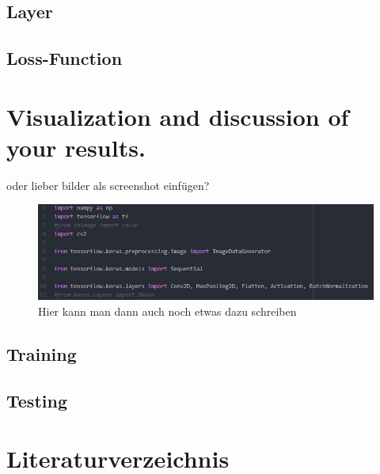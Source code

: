 \documentclass[12pt,letterpaper]{article}
\begin{document}
\subsection{Layer}
\subsection{Loss-Function}
\section{Visualization and discussion of your results.}
oder lieber bilder als screenshot einfügen?\\
\begin{figure}[ht]
	\centering
	\includegraphics[width=1.0\textwidth]{bsp.png}
	\caption{Hier kann man dann auch noch etwas dazu schreiben}
	\label{fig1}
\end{figure}
\subsection{Training}
\subsection{Testing}

\section{Literaturverzeichnis}
\label{Lit}

\renewcommand{\bibsection}{}


	
\end{document}
